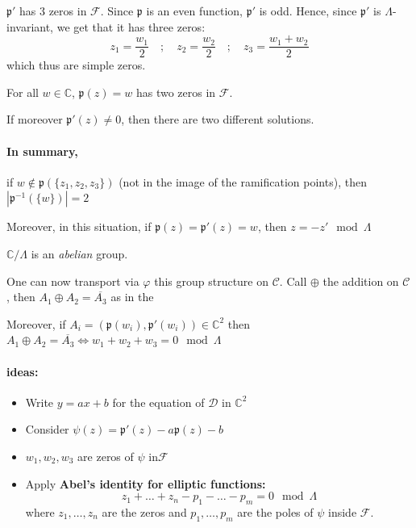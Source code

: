 \begin{corollary}[Consequence 1]
    \(\mathfrak{p}'\) has 3 zeros in \(\mathcal{F}\). Since \(\mathfrak{p}\) is
    an even function, \(\mathfrak{p}'\) is odd. Hence, since \(\mathfrak{p}'\)
    is \(\Lambda\)-invariant, we get that it has three zeros:
    \[
      z_{1} = \frac{w_{1}}{2} \quad ; \quad z_{2} = \frac{w_{2}}{2} \quad ;
      \quad z_{3} = \frac{w_{1} + w_{2}}{2}
    \]
    which thus are simple zeros.
\end{corollary}

\begin{corollary}[Consequence 2]
    For all \(w \in \mathbb{C}\), \(\mathfrak{p}{(z)} = w\) has two zeros in
    \(\mathcal{F}\).

    If moreover \(\mathfrak{p}'{(z)} \neq 0\), then there are two different
    solutions.
\end{corollary}

\paragraph{In summary,} if \(w \not\in  \mathfrak{p}{(\{z_{1}, z_{2}, z_{3}\}
)}\) (not in the image of the ramification points), then \(\left|
\mathfrak{p}^{-1}{(\{w\} )} \right| = 2\) 

Moreover, in this situation, if \(\mathfrak{p}{(z)} = \mathfrak{p}'{(z)} =w\),
then \(z = -z' \mod \Lambda\) 

\begin{proposition}
    \(\mathbb{C} / \Lambda\) is an \emph{abelian} group.
\end{proposition}

One can now transport via \(\varphi \) this group structure on \(\mathcal{C}\).
Call \(\oplus \) the addition on \(\mathcal{C}\), then \(A_{1} \oplus A_{2} =
\overline{A_{3}}\) as in the %

Moreover, if \(A_{i} = {(\mathfrak{p}{(w_{i})}, \mathfrak{p}'{(w_{i})})} \in
\mathbb{C}^2\) then \(A_{1} \oplus  A_{2} = \overline{A_{3}} \iff w_{1} + w_{2}
+ w_{3} = 0 \mod \Lambda\) 

\paragraph{ideas:}
\begin{itemize}[label = --]
    \item Write \(y = ax + b\) for the equation of \(\mathcal{D}\) in
        \(\mathbb{C}^2\) 
    \item Consider \(\psi {(z)} = \mathfrak{p}'{(z)} - a\mathfrak{p}{(z)} - b\) 
    \item \(w_{1}, w_{2}, w_{3}\) are zeros of \(\psi\) in\(\mathcal{F}\) 
    \item Apply \textbf{Abel's identity for elliptic functions:}
        \[
          z_{1} + \dots + z_{n} - p_{1} - \dots - p_{m} = 0 \mod \Lambda
        \]
        where \(z_{1}, \dots, z_{n}\) are the zeros and \(p_{1}, \dots, p_{m}\)
        are the poles of \(\psi\) inside \(\mathcal{F}\).
\end{itemize}

